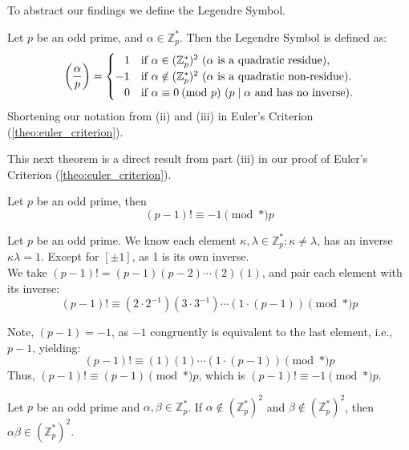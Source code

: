 \newpage
\noindent
To abstract our findings we define the Legendre Symbol.
\begin{Func}

    \label{def:le}

    Let $p$ be an odd prime, and $\alpha\in\mathbb{Z}_p^*$. Then the Legendre Symbol is defined as:
    \[
    \left(\frac{\alpha}{p}\right) = \begin{cases}
        \hspace{.8em}1 & \text{if } \alpha\in\qres\text{ ($\alpha$ is a quadratic residue),}\\
        -1 & \text{if } \alpha\notin\qres\text{ ($\alpha$ is a quadratic non-residue).}\\
        \hspace{.8em}0 & \text{if } \alpha\equiv 0\pmod*{p}\text{ ($p\mid\alpha$ and has no inverse).}
    \end{cases}
    \]
    \noindent
    Shortening our notation from (ii) and (iii) in Euler's Criterion (\ref{theo:euler_criterion}).
\end{Func}

\noindent
This next theorem is a direct result from part (iii) in our proof of Euler's Criterion (\ref{theo:euler_criterion}).
\begin{theo}

    \label{theo:wilson}
    Let $p$ be an odd prime, then
    \Large
    \[
    (p-1)! \equiv -1 \pmod*{p}
    \]
    \normalsize
\end{theo}

\begin{Proof}

    Let $p$ be an odd prime. We know each element $\kappa,\lambda\in\mathbb{Z}_p^*:\kappa\neq\lambda$, has an inverse
    $\kappa\lambda=1$. Except for $[\pm1]$, as 1 is its own inverse.\\

    \noindent
    We take $(p-1)!=(p-1)(p-2)\cdots(2)(1)$, and pair each element with its inverse:
    \[
        (p-1)! \equiv (2\cdot2^{-1})(3\cdot3^{-1})\cdots(1\cdot(p-1)) \pmod*{p}
    \]

    \noindent
    Note, $(p-1)= -1$, as $-1$ congruently is equivalent to the last element, i.e., $p-1$, yielding:
    \[
        (p-1)! \equiv (1)(1)\cdots (1\cdot(p-1)) \pmod*{p}
    \]
    Thus, $(p-1)! \equiv (p-1) \pmod*{p}$, which is $(p-1)! \equiv -1 \pmod*{p}$.

\end{Proof}
\begin{theo}

    Let \( p \) be an odd prime and \( \alpha, \beta \in \mathbb{Z}_p^* \). 
If \( \alpha \notin (\mathbb{Z}_p^*)^2 \) and \( \beta \notin (\mathbb{Z}_p^*)^2 \), 
then \( \alpha\beta \in (\mathbb{Z}_p^*)^2 \).
\end{theo}

